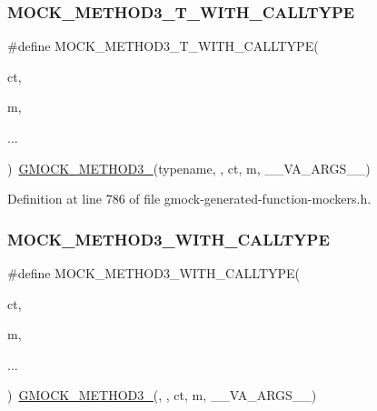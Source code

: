 \subsubsection{\texorpdfstring{M\+O\+C\+K\+\_\+\+M\+E\+T\+H\+O\+D3\+\_\+\+T\+\_\+\+W\+I\+T\+H\+\_\+\+C\+A\+L\+L\+T\+Y\+PE}{MOCK\_METHOD3\_T\_WITH\_CALLTYPE}}
{\footnotesize\ttfamily \#define M\+O\+C\+K\+\_\+\+M\+E\+T\+H\+O\+D3\+\_\+\+T\+\_\+\+W\+I\+T\+H\+\_\+\+C\+A\+L\+L\+T\+Y\+PE(\begin{DoxyParamCaption}\item[{}]{ct,  }\item[{}]{m,  }\item[{}]{... }\end{DoxyParamCaption})~\hyperlink{gmock-generated-function-mockers_8h_af7c77ba511c631de02bb8c45a6ed3045}{G\+M\+O\+C\+K\+\_\+\+M\+E\+T\+H\+O\+D3\+\_\+}(typename, , ct, m, \+\_\+\+\_\+\+V\+A\+\_\+\+A\+R\+G\+S\+\_\+\+\_\+)}



Definition at line 786 of file gmock-\/generated-\/function-\/mockers.\+h.

\mbox{\label{gmock-generated-function-mockers_8h_afef2985a236f7588139c690d395758fb}} 
\subsubsection{\texorpdfstring{M\+O\+C\+K\+\_\+\+M\+E\+T\+H\+O\+D3\+\_\+\+W\+I\+T\+H\+\_\+\+C\+A\+L\+L\+T\+Y\+PE}{MOCK\_METHOD3\_WITH\_CALLTYPE}}
{\footnotesize\ttfamily \#define M\+O\+C\+K\+\_\+\+M\+E\+T\+H\+O\+D3\+\_\+\+W\+I\+T\+H\+\_\+\+C\+A\+L\+L\+T\+Y\+PE(\begin{DoxyParamCaption}\item[{}]{ct,  }\item[{}]{m,  }\item[{}]{... }\end{DoxyParamCaption})~\hyperlink{gmock-generated-function-mockers_8h_af7c77ba511c631de02bb8c45a6ed3045}{G\+M\+O\+C\+K\+\_\+\+M\+E\+T\+H\+O\+D3\+\_\+}(, , ct, m, \+\_\+\+\_\+\+V\+A\+\_\+\+A\+R\+G\+S\+\_\+\+\_\+)}



